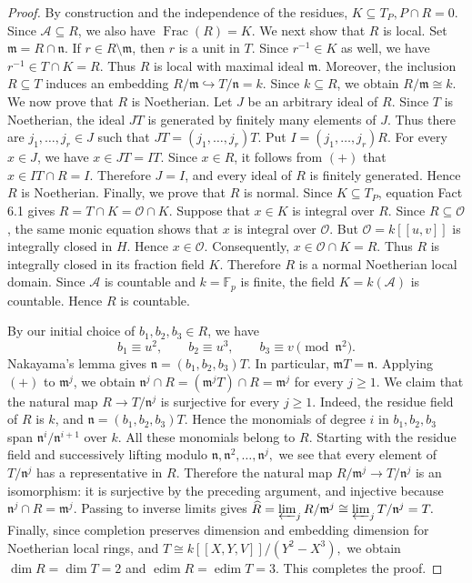 \documentclass[11pt,a4paper]{amsart}
\numberwithin{equation}{section}
\begin{document}
\begin{proof}
	
	\medskip
	\noindent
		By construction and the independence of the residues,
$	K\subseteq T_P,  P\cap R=0.$
Since $\mathcal A\subseteq R$, we also have
$	\operatorname{Frac}(R)=K.$	We next show that $R$ is local. Set
$\mathfrak m=R\cap\mathfrak n.$
If $r\in R\setminus\mathfrak m$, then $r$ is a unit in $T$.
Since $r^{-1}\in K$ as well, we have
$r^{-1}\in T\cap K=R.$	Thus $R$ is local with maximal ideal $\mathfrak m$.	Moreover, the inclusion $R\subseteq T$ induces an embedding
$R/\mathfrak m\hookrightarrow T/\mathfrak n=k.$ Since $k\subseteq R$, we obtain
$R/\mathfrak m\cong k.$ We now prove that $R$ is Noetherian. Let $J$ be an arbitrary	ideal of $R$. Since $T$ is Noetherian, the ideal $JT$ is	generated by finitely many elements of $J$. Thus there are
$j_1,\ldots,j_r\in J$ such that
$JT=(j_1,\ldots,j_r)T.$	Put $I=(j_1,\ldots,j_r)R$. For every $x\in J$, we have
$	x\in JT=IT.$	Since $x\in R$, it follows from $(+)$
	that
$	x\in IT\cap R=I.$	Therefore $J=I$, and every ideal of $R$ is finitely generated.	Hence $R$ is Noetherian.
Finally, we prove that $R$ is normal. Since	$K\subseteq T_P$, equation Fact 6.1 gives
$	R=T\cap K=\mathcal O\cap K.$	Suppose that $x\in K$ is integral over $R$. Since	$R\subseteq\mathcal O$, the same monic equation shows that	$x$ is integral over $\mathcal O$. But $\mathcal O=k[[u,v]]$	is integrally closed in $H$. Hence $x\in\mathcal O$.	Consequently, $	x\in\mathcal O\cap K=R.$
Thus $R$ is integrally closed in its fraction field $K$.
Therefore $R$ is a normal Noetherian local domain.
Since $\mathcal A$ is countable and $k=\mathbb F_p$ is finite,
	the field $K=k(\mathcal A)$ is countable. Hence $R$ is countable.
	
	\medskip
	\noindent
	By our initial choice of $b_1,b_2,b_3\in R$, we have
	\[
	b_1\equiv u^2,\qquad
	b_2\equiv u^3,\qquad
	b_3\equiv v
	\pmod{\mathfrak n^2}.
	\]
	Nakayama's lemma gives
$\mathfrak n=(b_1,b_2,b_3)T.$
	In particular,
$\mathfrak mT=\mathfrak n.$ 	Applying $(+)$ to $\mathfrak m^j$,
we obtain
$	\mathfrak n^j\cap R
	=(\mathfrak m^jT)\cap R
	=\mathfrak m^j	$
	for every $j\geq1$.
	We claim that the natural map
$R\longrightarrow T/\mathfrak n^j$
	is surjective for every $j\geq1$.
Indeed, the residue field of $R$ is $k$, and
	$\mathfrak n=(b_1,b_2,b_3)T$. Hence the monomials of degree
	$i$ in $b_1,b_2,b_3$ span
$
	\mathfrak n^i/\mathfrak n^{i+1}
$
	over $k$. All these monomials belong to $R$. Starting with
	the residue field and successively lifting modulo
$	\mathfrak n,\mathfrak n^2,\ldots,\mathfrak n^j,$ we see that every element of $T/\mathfrak n^j$ has a	representative in $R$. Therefore the natural map
$	R/\mathfrak m^j\longrightarrow T/\mathfrak n^j
$ is an isomorphism: it is surjective by the preceding argument,
	and injective because $	\mathfrak n^j\cap R=\mathfrak m^j.$	Passing to inverse limits gives
$	\widehat R
=\varprojlim_j R/\mathfrak m^j\cong
\varprojlim_j T/\mathfrak n^j=T.$ Finally, since completion preserves dimension and embedding
	dimension for Noetherian local rings, and
$	T\cong k[[X,Y,V]]/(Y^2-X^3),$ we obtain
$	\dim R=\dim T=2$	and
$\operatorname{edim}R
	=\operatorname{edim}T=3.$ This completes the proof.
\end{proof}
\end{document}
